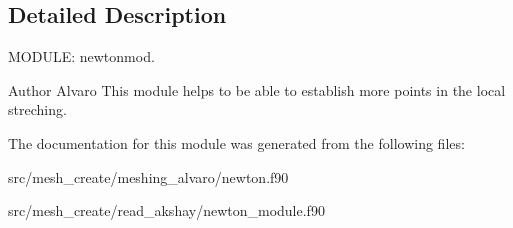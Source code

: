 \subsection{Detailed Description}
M\-O\-D\-U\-L\-E\-: newtonmod. 

\begin{DoxyAuthor}{Author}
Alvaro This module helps to be able to establish more points in the local streching. 
\end{DoxyAuthor}


The documentation for this module was generated from the following files\-:\begin{DoxyCompactItemize}
\item 
src/mesh\-\_\-create/meshing\-\_\-alvaro/newton.\-f90\item 
src/mesh\-\_\-create/read\-\_\-akshay/newton\-\_\-module.\-f90\end{DoxyCompactItemize}
